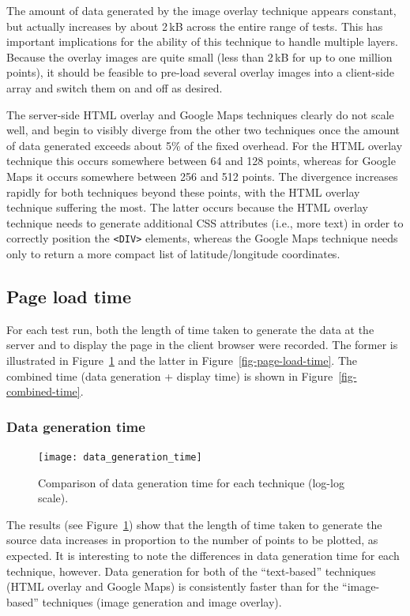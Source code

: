 \documentclass[acmnow]{acmtrans2m}
\begin{document}
The amount of data generated by the image overlay technique appears
constant, but actually increases by about 2\,kB across the entire range
of tests. This has important implications for the ability of this
technique to handle multiple layers. Because the overlay images are
quite small (less than 2\,kB for up to one million points), it should be
feasible to pre-load several overlay images into a client-side array and
switch them on and off as desired.

The server-side HTML overlay and Google Maps techniques clearly do not
scale well, and begin to visibly diverge from the other two techniques
once the amount of data generated exceeds about 5\% of the fixed
overhead. For the HTML overlay technique this occurs somewhere between
64 and 128 points, whereas for Google Maps it occurs somewhere between
256 and 512 points. The divergence increases rapidly for both techniques
beyond these points, with the HTML overlay technique suffering the most.
The latter occurs because the HTML overlay technique needs to generate
additional CSS attributes (i.e., more text) in order to correctly
position the \verb|<DIV>| elements, whereas the Google Maps technique
needs only to return a more compact list of latitude/longitude
coordinates.


\subsection{Page load time}

For each test run, both the length of time taken to generate the data at
the server and to display the page in the client browser were recorded.
The former is illustrated in Figure~\ref{fig-data-generation-time} and
the latter in Figure~\ref{fig-page-load-time}. The combined time (data
generation + display time) is shown in Figure~\ref{fig-combined-time}.


\subsubsection{Data generation time}


\begin{figure}
	\centering
	\texttt{[image: data\_generation\_time]}
	\caption{Comparison of data generation time for each technique (log-log scale).}
	\label{fig-data-generation-time}
\end{figure}


The results (see Figure~\ref{fig-data-generation-time}) show that the
length of time taken to generate the source data increases in proportion
to the number of points to be plotted, as expected. It is interesting to
note the differences in data generation time for each technique,
however. Data generation for both of the ``text-based'' techniques (HTML
overlay and Google Maps) is consistently faster than for the
``image-based'' techniques (image generation and image overlay).
\end{document}
